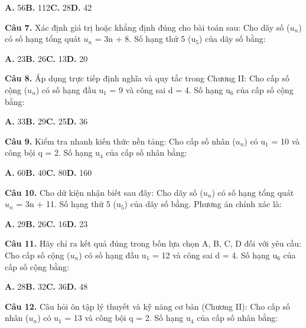 \documentclass[11pt,a4paper]{article}
\begin{document}
\hspace*{1.5em}\textbf{A.} 56\quad\quad \textbf{B.} 112\quad\quad \textbf{C.} 28\quad\quad \textbf{D.} 42\par\vspace{2pt}
\textbf{\color{primary} Câu 7.} Xác định giá trị hoặc khẳng định đúng cho bài toán sau: Cho dãy số ($u_n$) có số hạng tổng quát $u_n$ = 3n + 8. Số hạng thứ 5 (u$_5$) của dãy số bằng:\par
\hspace*{1.5em}\textbf{A.} 23\quad\quad \textbf{B.} 26\quad\quad \textbf{C.} 13\quad\quad \textbf{D.} 20\par\vspace{2pt}
\textbf{\color{primary} Câu 8.} Áp dụng trực tiếp định nghĩa và quy tắc trong Chương II: Cho cấp số cộng ($u_n$) có số hạng đầu u$_1$ = 9 và công sai d = 4. Số hạng u$_6$ của cấp số cộng bằng:\par
\hspace*{1.5em}\textbf{A.} 33\quad\quad \textbf{B.} 29\quad\quad \textbf{C.} 25\quad\quad \textbf{D.} 36\par\vspace{2pt}
\textbf{\color{primary} Câu 9.} Kiểm tra nhanh kiến thức nền tảng: Cho cấp số nhân ($u_n$) có u$_1$ = 10 và công bội q = 2. Số hạng u$_4$ của cấp số nhân bằng:\par
\hspace*{1.5em}\textbf{A.} 60\quad\quad \textbf{B.} 40\quad\quad \textbf{C.} 80\quad\quad \textbf{D.} 160\par\vspace{2pt}
\textbf{\color{primary} Câu 10.} Cho dữ kiện nhận biết sau đây: Cho dãy số ($u_n$) có số hạng tổng quát $u_n$ = 3n + 11. Số hạng thứ 5 (u$_5$) của dãy số bằng. Phương án chính xác là:\par
\hspace*{1.5em}\textbf{A.} 29\quad\quad \textbf{B.} 26\quad\quad \textbf{C.} 16\quad\quad \textbf{D.} 23\par\vspace{2pt}
\textbf{\color{primary} Câu 11.} Hãy chỉ ra kết quả đúng trong bốn lựa chọn A, B, C, D đối với yêu cầu: Cho cấp số cộng ($u_n$) có số hạng đầu u$_1$ = 12 và công sai d = 4. Số hạng u$_6$ của cấp số cộng bằng:\par
\hspace*{1.5em}\textbf{A.} 28\quad\quad \textbf{B.} 32\quad\quad \textbf{C.} 36\quad\quad \textbf{D.} 48\par\vspace{2pt}
\textbf{\color{primary} Câu 12.} Câu hỏi ôn tập lý thuyết và kỹ năng cơ bản (Chương II): Cho cấp số nhân ($u_n$) có u$_1$ = 13 và công bội q = 2. Số hạng u$_4$ của cấp số nhân bằng:\par
\end{document}
